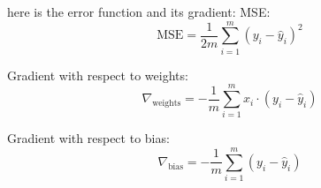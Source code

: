 here is the error function and its gradient:
MSE: 
\[
\text{MSE} = \frac{1}{2m} \sum_{i=1}^{m} (y_i - \hat{y}_i)^2
\]

Gradient with respect to weights:
\[
\nabla_{\text{weights}} = -\frac{1}{m} \sum_{i=1}^{m} x_i \cdot (y_i - \hat{y}_i)
\]

Gradient with respect to bias:
\[
\nabla_{\text{bias}} = -\frac{1}{m} \sum_{i=1}^{m} (y_i - \hat{y}_i)
\]
